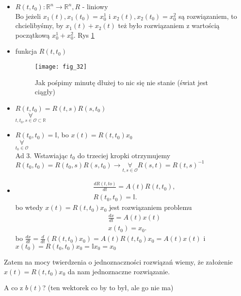 \documentclass[../main.tex]{subfiles}
\begin{document}
    \begin{itemize}
        \item $R(t,t_0): \mathbb{R}^n\to\mathbb{R}^n, R$ - liniowy\label{eq:131}\\
            Bo jeżeli $x_1(t), x_1(t_0)=x_0^1$ i $x_2(t),x_2(t_0) = x_0^2$ są rozwiązaniem, to chcielibyśmy, by  $x_1(t) + x_2(t)$ też było rozwiązaniem z wartością początkową $x_0^1+x_0^2$. Rys \ref{fig:fig_32}
        \item funkcja $R(t,t_0)$
            \begin{figure}
                \centering
                \texttt{[image: fig\_32]}
                \caption{Jak pośpimy minutę dłużej to nic się nie stanie (świat jest ciągły)}
                \label{fig:fig_32}
            \end{figure}
        \item $R(t,t_0) = R(t,s) R(s,t_0)$\\
            $\underset{t,t_0,s\in\mathcal{O}\subset\mathbb{R}}{\forall} $
        \item $R(t_0,t_0) = \mathbb{I}$, bo $x(t) = R(t,t_0)x_0$\\
            $\underset{t_0\in\mathcal{O}}{\forall} $ \\
            Ad 3. Wstawiając $t_0$ do trzeciej kropki otrzymujemy $R(t_0,t_0)=R(t_0,s)R(s,t_0)\rightarrow \underset{t,s\in\mathcal{O}}{\forall} R(s,t) = R(t,s)^{-1}$
        \item
            \begin{align*}
                &\frac{dR(t,to)}{dt} = A(t)R(t,t_0),\\
                &R(t_0,t_0) = \mathbb{I}
            .\end{align*}
            bo wtedy
            $x(t) = R(t,t_0)x_0$ jest rozwiązaniem problemu
            \begin{align*}
                &\frac{dx}{dt}=A(t)x(t)\\
                &x(t_0)=x_0
            .\end{align*}
            bo $\frac{dx}{dt} = \frac{d}{dt}(R(t,t_0)x_0) = A(t)R(t,t_0)x_0=A(t)x(t)$ i $x(t_0)=R(t_0,t_0)x_0 = \mathbb{I}x_0 = x_0$
    \end{itemize}
    Zatem na mocy twierdzenia o jednoznaczności rozwiązań wiemy, że założenie $x(t) = R(t,t_0)x_0$ da nam jednoznaczne rozwiązanie.
    \begin{pytanie}
        A co z $b(t)$? (ten wektorek co by to był, ale go nie ma)
    \end{pytanie}
\end{document}
